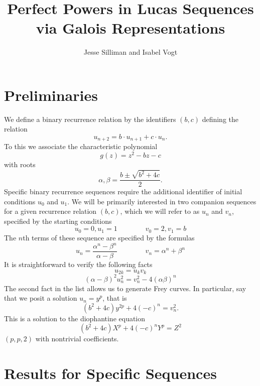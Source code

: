 \documentclass[12pt]{amsart}
\theoremstyle{definition}
\begin{document}
\title{Perfect Powers in Lucas Sequences via Galois Representations}
\author{Jesse Silliman and Isabel Vogt}

\maketitle

\section{Preliminaries}


We define a binary recurrence relation by the identifiers $(b,c)$ defining the relation
\[ u_{n+2} = b\cdot u_{n+1}+ c\cdot u_n. \]
To this we associate the characteristic polynomial
\[ g(z) = z^2 - bz - c\]
with roots
\[ \alpha, \beta = \frac{b \pm \sqrt{b^2+4c}}{2}. \]
Specific binary recurrence sequences require the additional identifier of initial conditions $u_0$ and $u_1$.  We will be primarily interested in two companion sequences for a given recurrence relation $(b,c)$, which we will refer to as $u_n$ and $v_n$, specified by the starting conditions
\[ u_0 = 0, u_1 = 1 \qquad \qquad v_0 = 2, v_1 = b \]
The $n$th terms of these sequence are specified by the formulas
\[u_n = \frac{\alpha^n - \beta^n}{\alpha - \beta} \qquad \qquad v_n = \alpha^n +\beta^n \]
It is straightforward to verify the following facts
\begin{equation}\label{fib2} u_{2k} = u_kv_k \end{equation}
\begin{equation}\label{gen_diophan}(\alpha - \beta)^2u_n^2 = v_n^2 - 4(\alpha\beta)^n \end{equation}
The second fact in the list allows us to generate Frey curves.  In particular, say that we posit a solution $u_n = y^p$, that is
\begin{equation}\label{rel_diophan} (b^2+4c)y^{2p}+4(-c)^n = v_n^2 .\end{equation}
This is a solution to the diophantine equation
\[ (b^2+4c)X^p +4(-c)^nY^p = Z^2 \]
$(p,p,2)$ with nontrivial coefficients.

\section{Results for Specific Sequences}
\end{document}
